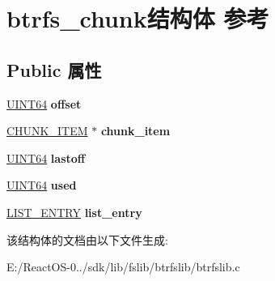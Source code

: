 \hypertarget{structbtrfs__chunk}{}\section{btrfs\+\_\+chunk结构体 参考}
\label{structbtrfs__chunk}
\subsection*{Public 属性}
\begin{DoxyCompactItemize}
\item 
\mbox{\label{structbtrfs__chunk_ae0e929bf926af498e947913b496678b2}} 
\hyperlink{_processor_bind_8h_a57be03562867144161c1bfee95ca8f7c}{U\+I\+N\+T64} {\bfseries offset}
\item 
\mbox{\label{structbtrfs__chunk_a92eac8acc5314d913ccefe2af9cbf23a}} 
\hyperlink{struct_c_h_u_n_k___i_t_e_m}{C\+H\+U\+N\+K\+\_\+\+I\+T\+EM} $\ast$ {\bfseries chunk\+\_\+item}
\item 
\mbox{\label{structbtrfs__chunk_a215700142e6876db61b5efcb0614f4b1}} 
\hyperlink{_processor_bind_8h_a57be03562867144161c1bfee95ca8f7c}{U\+I\+N\+T64} {\bfseries lastoff}
\item 
\mbox{\label{structbtrfs__chunk_a8a79ead66f3029cffc2fe3c04f395f03}} 
\hyperlink{_processor_bind_8h_a57be03562867144161c1bfee95ca8f7c}{U\+I\+N\+T64} {\bfseries used}
\item 
\mbox{\label{structbtrfs__chunk_a1962035ffcef405c338647b796f803a2}} 
\hyperlink{struct___l_i_s_t___e_n_t_r_y}{L\+I\+S\+T\+\_\+\+E\+N\+T\+RY} {\bfseries list\+\_\+entry}
\end{DoxyCompactItemize}


该结构体的文档由以下文件生成\+:\begin{DoxyCompactItemize}
\item 
E\+:/\+React\+O\+S-\/0../sdk/lib/fslib/btrfslib/btrfslib.\+c\end{DoxyCompactItemize}
